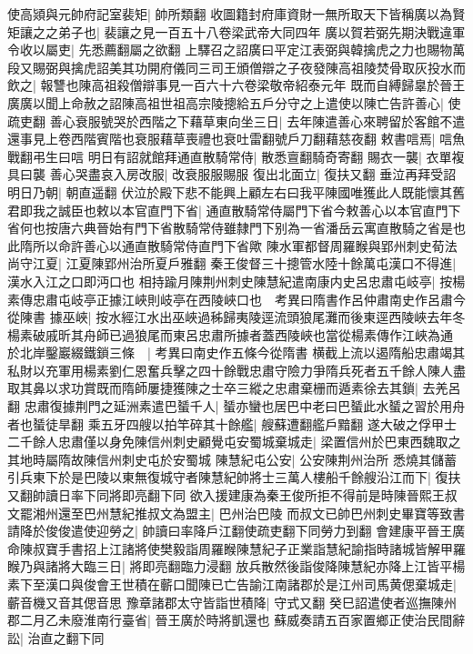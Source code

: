使高熲與元帥府記室裴矩|{
	帥所類翻}
收圖籍封府庫資財一無所取天下皆稱廣以為賢矩讓之之弟子也|{
	裴讓之見一百五十八卷梁武帝大同四年}
廣以賀若弼先期決戰違軍令收以屬吏|{
	先悉薦翻屬之欲翻}
上驛召之詔廣曰平定江表弼與韓擒虎之力也賜物萬段又賜弼與擒虎詔美其功開府儀同三司王頒僧辯之子夜發陳高祖陵焚骨取灰投水而飲之|{
	報讐也陳高祖殺僧辯事見一百六十六卷梁敬帝紹泰元年}
既而自縛歸辠於晉王廣廣以聞上命赦之詔陳高祖世祖高宗陵摠給五戶分守之上遣使以陳亡告許善心|{
	使疏吏翻}
善心衰服號哭於西階之下藉草東向坐三日|{
	去年陳遣善心來聘留於客館不遣還事見上卷西階賓階也衰服藉草喪禮也衰吐雷翻號戶刀翻藉慈夜翻}
敕書唁焉|{
	唁魚戰翻弔生曰唁}
明日有詔就館拜通直散騎常侍|{
	散悉亶翻騎奇寄翻}
賜衣一襲|{
	衣單複具曰襲}
善心哭盡哀入房改服|{
	改衰服服賜服}
復出北面立|{
	復扶又翻}
垂泣再拜受詔明日乃朝|{
	朝直遥翻}
伏泣於殿下悲不能興上顧左右曰我平陳國唯獲此人既能懷其舊君即我之誠臣也敕以本官直門下省|{
	通直散騎常侍屬門下省今敕善心以本官直門下省何也按唐六典晉始有門下省散騎常侍雖隸門下别為一省潘岳云寓直散騎之省是也此隋所以命許善心以通直散騎常侍直門下省歟}
陳水軍都督周羅睺與郢州刺史荀法尚守江夏|{
	江夏陳郢州治所夏戶雅翻}
秦王俊督三十摠管水陸十餘萬屯漢口不得進|{
	漢水入江之口即沔口也}
相持踰月陳荆州刺史陳慧紀遣南康内史呂忠肅屯岐亭|{
	按楊素傳忠肅屯岐亭正據江峽則岐亭在西陵峽口也　考異曰隋書作呂仲肅南史作呂肅今從陳書}
據巫峽|{
	按水經江水出巫峽過秭歸夷陵逕流頭狼尾灘而後東逕西陵峽去年冬楊素破戚昕其舟師已過狼尾而東呂忠肅所據者蓋西陵峽也當從楊素傳作江峽為通}
於北岸鑿巖綴鐵鎖三條　|{
	考異曰南史作五條今從隋書}
横截上流以遏隋船忠肅竭其私財以充軍用楊素劉仁恩奮兵擊之四十餘戰忠肅守險力爭隋兵死者五千餘人陳人盡取其鼻以求功賞既而隋師屢捷獲陳之士卒三縱之忠肅棄栅而遁素徐去其鎖|{
	去羌呂翻}
忠肅復據荆門之延洲素遣巴蜑千人|{
	蜑亦蠻也居巴中老曰巴蜑此水蜑之習於用舟者也蜑徒旱翻}
乘五牙四艘以拍竿碎其十餘艦|{
	艘蘇遭翻艦戶黯翻}
遂大破之俘甲士二千餘人忠肅僅以身免陳信州刺史顧覺屯安蜀城棄城走|{
	梁置信州於巴東西魏取之其地時屬隋故陳信州刺史屯於安蜀城}
陳慧紀屯公安|{
	公安陳荆州治所}
悉燒其儲蓄引兵東下於是巴陵以東無復城守者陳慧紀帥將士三萬人樓船千餘艘沿江而下|{
	復扶又翻帥讀日率下同將即亮翻下同}
欲入援建康為秦王俊所拒不得前是時陳晉熙王叔文罷湘州還至巴州慧紀推叔文為盟主|{
	巴州治巴陵}
而叔文已帥巴州刺史畢寶等致書請降於俊俊遣使迎勞之|{
	帥讀曰率降戶江翻使疏吏翻下同勞力到翻}
會建康平晉王廣命陳叔寶手書招上江諸將使樊毅詣周羅睺陳慧紀子正業詣慧紀諭指時諸城皆解甲羅睺乃與諸將大臨三日|{
	將即亮翻臨力浸翻}
放兵散然後詣俊降陳慧紀亦降上江皆平楊素下至漢口與俊會王世積在蘄口聞陳已亡告諭江南諸郡於是江州司馬黄偲棄城走|{
	蘄音機又音其偲音思}
豫章諸郡太守皆詣世積降|{
	守式又翻}
癸巳詔遣使者巡撫陳州郡二月乙未廢淮南行臺省|{
	晉王廣於時將凱還也}
蘇威奏請五百家置鄉正使治民間辭訟|{
	治直之翻下同}
